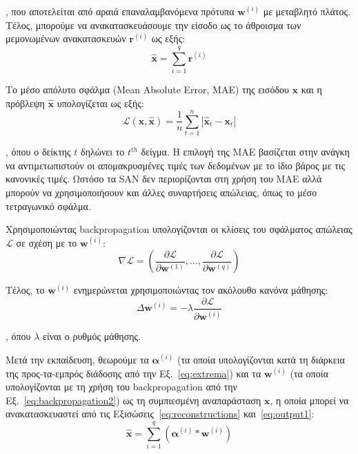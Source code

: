 \noindent
, που αποτελείται από αραιά επαναλαμβανόμενα πρότυπα $\bm{w}^{(i)}$ με μεταβλητό πλάτος.
Τέλος, μπορούμε να ανακατασκευάσουμε την είσοδο ως το άθροισμα των μεμονωμένων ανακατασκευών $\bm{r}^{(i)}$ ως εξής:
\begin{equation}
	\label{eq:output1}
	\hat{\bm{x}} = \sum \limits_{i=1}^q \bm{r}^{(i)}
\end{equation}

Το μέσο απόλυτο σφάλμα (Mean Absolute Error, MAE) της εισόδου $\bm{x}$ και η πρόβλεψη $\hat{\bm{x}}$ υπολογίζεται ως εξής:
\begin{equation}
	\label{eq:lossfunction}
	\mathcal{L}\left( {\bm{x},\hat{\bm{x}}} \right) = \frac{1}{n}\sum\limits_{t=1}^n \left|\hat{\bm{x}}_t - \bm{x}_t \right|
\end{equation}

\noindent
, όπου ο δείκτης $t$ δηλώνει το $t^{th}$ δείγμα.
Η επιλογή της ΜΑΕ βασίζεται στην ανάγκη να αντιμετωπιστούν οι απομακρυσμένες τιμές των δεδομένων με το ίδιο βάρος με τις κανονικές τιμές.
Ωστόσο τα SAN δεν περιορίζονται στη χρήση του MAE αλλά μπορούν να χρησιμοποιήσουν και άλλες συναρτήσεις απώλειας, όπως το μέσο τετραγωνικό σφάλμα.

Χρησιμοποιώντας backpropagation υπολογίζονται οι κλίσεις του σφάλματος απώλειας $\mathcal{L}$ σε σχέση με το $\bm{w}^{(i)}$:
\begin{equation}
	\label{eq:backpropagation1}
	\nabla\mathcal{L} = \left( \frac{\partial\mathcal{L}}{\partial\bm{w}^{(1)}},\ldots,\frac{\partial\mathcal{L}}{\partial\bm{w}^{(q)}}\right)
\end{equation}

Τέλος, το $\bm{w}^{(i)}$ ενημερώνεται χρησιμοποιώντας τον ακόλουθο κανόνα μάθησης:
\begin{equation}
	\label{eq:backpropagation2}
	\Delta\bm{w}^{(i)} = -\lambda\frac{\partial\mathcal{L}}{\partial\bm{w}^{(i)}}
\end{equation}

\noindent
, όπου $\lambda$ είναι ο ρυθμός μάθησης.

Μετά την εκπαίδευση, θεωρούμε τα $\bm{\alpha}^{(i)}$ (τα οποία υπολογίζονται κατά τη διάρκεια της προς-τα-εμπρός διάδοσης από την Εξ.~\ref{eq:extrema}) και τα $\bm{w}^{(i)}$ (τα οποία υπολογίζονται με τη χρήση του backpropagation από την Εξ.~\ref{eq:backpropagation2}) ως τη συμπιεσμένη αναπαράσταση $\bm{x}$, η οποία μπορεί να ανακατασκευαστεί από τις Εξισώσεις~\ref{eq:reconstructions} και~\ref{eq:output1}:
\begin{equation}
	\label{eq:output2}
	\hat{\bm{x}} = \sum\limits_{i=1}^q \left(\bm{\alpha}^{(i)} * \bm{w}^{(i)}\right)
\end{equation}

